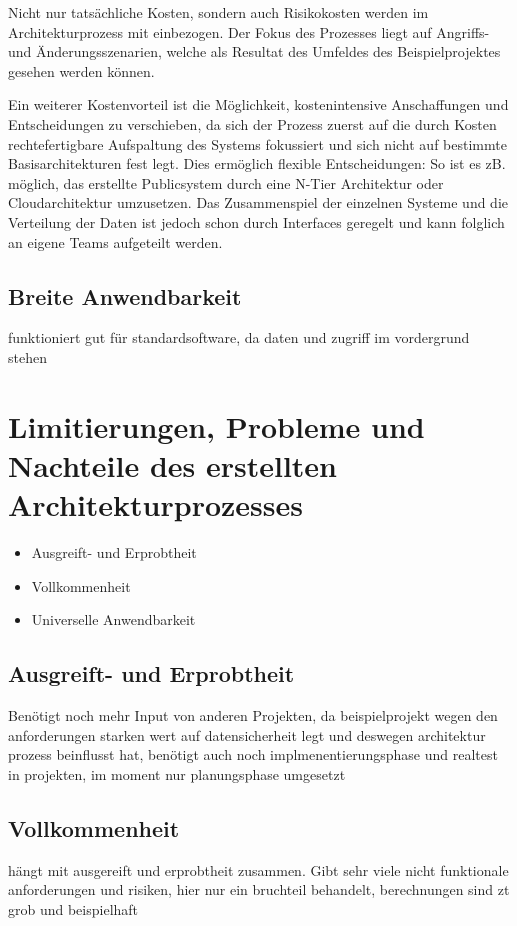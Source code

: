 Nicht nur tatsächliche Kosten, sondern auch Risikokosten werden im Architekturprozess mit einbezogen. Der Fokus des Prozesses liegt auf Angriffs- und Änderungsszenarien, welche als Resultat des Umfeldes des Beispielprojektes gesehen werden können.

Ein weiterer Kostenvorteil ist die Möglichkeit, kostenintensive Anschaffungen und Entscheidungen zu verschieben, da sich der Prozess zuerst auf die durch Kosten rechtefertigbare Aufspaltung des Systems fokussiert und sich nicht auf bestimmte Basisarchitekturen fest legt. Dies ermöglich flexible Entscheidungen: So ist es zB. möglich, das erstellte Publicsystem durch eine N-Tier Architektur oder Cloudarchitektur umzusetzen. Das Zusammenspiel der einzelnen Systeme und die Verteilung der Daten ist jedoch schon durch Interfaces geregelt und kann folglich an eigene Teams aufgeteilt werden.


\subsection{Breite Anwendbarkeit}
funktioniert gut für standardsoftware, da daten und zugriff im vordergrund stehen



\section{Limitierungen, Probleme und Nachteile des erstellten Architekturprozesses}

\begin{itemize}
  \item Ausgreift- und Erprobtheit
  \item Vollkommenheit
  \item Universelle Anwendbarkeit
\end{itemize}

\subsection{Ausgreift- und Erprobtheit}
Benötigt noch mehr Input von anderen Projekten, da beispielprojekt wegen den anforderungen starken wert auf datensicherheit legt und deswegen architektur prozess beinflusst hat, benötigt auch noch implmenentierungsphase und realtest in projekten, im moment nur planungsphase umgesetzt

\subsection{Vollkommenheit}
hängt mit ausgereift und erprobtheit zusammen. Gibt sehr viele nicht funktionale anforderungen und risiken, hier nur ein bruchteil behandelt, berechnungen sind zt grob und beispielhaft

